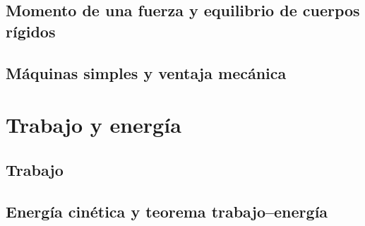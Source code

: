 ﻿\documentclass[11pt,letterpaper,openany]{book}
\newcommand{\rutaraiz}{../..}
\begin{document}




\chapter{Momento de una fuerza y equilibrio de cuerpos rígidos}





\chapter{Máquinas simples y ventaja mecánica}





\part{Trabajo y energía}



\chapter{Trabajo}





\chapter{Energía cinética y teorema trabajo--energía}
\end{document}
